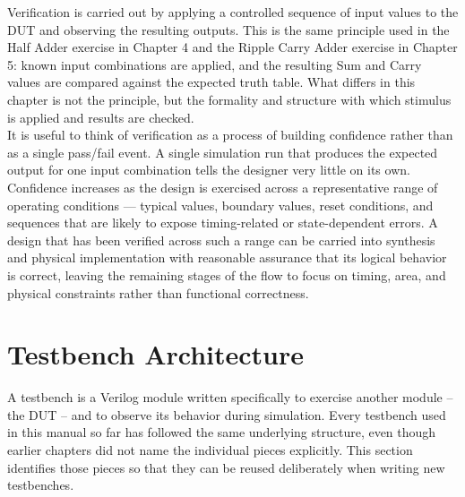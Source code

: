 \noindent Verification is carried out by applying a controlled sequence of input values to the DUT and observing the resulting outputs. This is the same principle used in the Half Adder exercise in Chapter 4 and the Ripple Carry Adder exercise in Chapter 5: known input combinations are applied, and the resulting Sum and Carry values are compared against the expected truth table. What differs in this chapter is not the principle, but the formality and structure with which stimulus is applied and results are checked.\\


\noindent It is useful to think of verification as a process of building confidence rather than as a single pass/fail event. A single simulation run that produces the expected output for one input combination tells the designer very little on its own. Confidence increases as the design is exercised across a representative range of operating conditions — typical values, boundary values, reset conditions, and sequences that are likely to expose timing-related or state-dependent errors. A design that has been verified across such a range can be carried into synthesis and physical implementation with reasonable assurance that its logical behavior is correct, leaving the remaining stages of the flow to focus on timing, area, and physical constraints rather than functional correctness.\\




\section{Testbench Architecture}
A testbench is a Verilog module written specifically to exercise another module --  the DUT -- and to observe its behavior during simulation. Every testbench used in this manual so far has followed the same underlying structure, even though earlier chapters did not name the individual pieces explicitly. This section identifies those pieces so that they can be reused deliberately when writing new testbenches. \\

